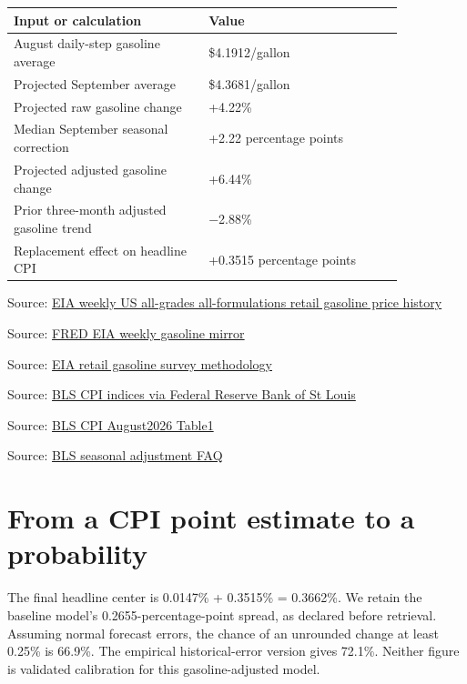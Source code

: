 \documentclass[11pt]{article}
\begin{document}
\begin{longtable}{>{\raggedright\arraybackslash}p{0.425\linewidth}>{\raggedright\arraybackslash}p{0.425\linewidth}}
\textbf{Input or calculation} & \textbf{Value} \\ \hline\endhead
August daily-step gasoline average & \$4.1912/gallon \\
Projected September average & \$4.3681/gallon \\
Projected raw gasoline change & +4.22\% \\
Median September seasonal correction & +2.22 percentage points \\
Projected adjusted gasoline change & +6.44\% \\
Prior three-month adjusted gasoline trend & −2.88\% \\
Replacement effect on headline CPI & +0.3515 percentage points \\
\end{longtable}
\par{\small Source: \href{https://www.eia.gov/dnav/pet/hist\_xls/EMM\_EPM0\_PTE\_NUS\_DPGw.xls}{EIA weekly US all-grades all-formulations retail gasoline price history}}
\par{\small Source: \href{https://fred.stlouisfed.org/graph/fredgraph.csv?id=GASALLW\&cosd=2026-07-01\&coed=2026-09-16}{FRED EIA weekly gasoline mirror}}
\par{\small Source: \href{https://www.eia.gov/petroleum/gasdiesel/gas\_proc-methods.php}{EIA retail gasoline survey methodology}}
\par{\small Source: \href{https://fred.stlouisfed.org/graph/fredgraph.csv?id=CPIAUCSL,CUSR0000SETB01,CUUR0000SETB01\&cosd=2021-08-01\&coed=2026-08-01}{BLS CPI indices via Federal Reserve Bank of St Louis}}
\par{\small Source: \href{https://www.bls.gov/news.release/cpi.t01.htm}{BLS CPI August2026 Table1}}
\par{\small Source: \href{https://www.bls.gov/cpi/seasonal-adjustment/questions-and-answers.htm}{BLS seasonal adjustment FAQ}}
\section*{\textcolor{epdarkgreen}{From a CPI point estimate to a probability}}
The final headline center is 0.0147\% + 0.3515\% = 0.3662\%. We retain the baseline model’s 0.2655-percentage-point spread, as declared before retrieval. Assuming normal forecast errors, the chance of an unrounded change at least 0.25\% is 66.9\%. The empirical historical-error version gives 72.1\%. Neither figure is validated calibration for this gasoline-adjusted model.
\end{document}
